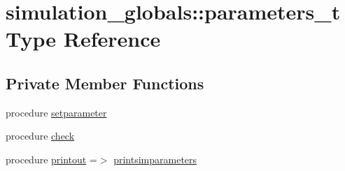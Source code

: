 \hypertarget{structsimulation__globals_1_1parameters__t}{}\section{simulation\+\_\+globals\+:\+:parameters\+\_\+t Type Reference}
\label{structsimulation__globals_1_1parameters__t}
\subsection*{Private Member Functions}
\begin{DoxyCompactItemize}
\item 
procedure \hyperlink{structsimulation__globals_1_1parameters__t_ad59ffcdf9208a52e7d3dae903197be74}{setparameter}
\item 
procedure \hyperlink{structsimulation__globals_1_1parameters__t_a5402a171a26d5e6a73b5bf284bf0aa57}{check}
\item 
procedure \hyperlink{structsimulation__globals_1_1parameters__t_a6b56d89976f9cef3fef2e8f54fcb1bdf}{printout} =$>$ \hyperlink{namespacesimulation__globals_a0b17b2f2e9e7dbbad7c9d735217c1ee1}{printsimparameters}
\end{DoxyCompactItemize}
